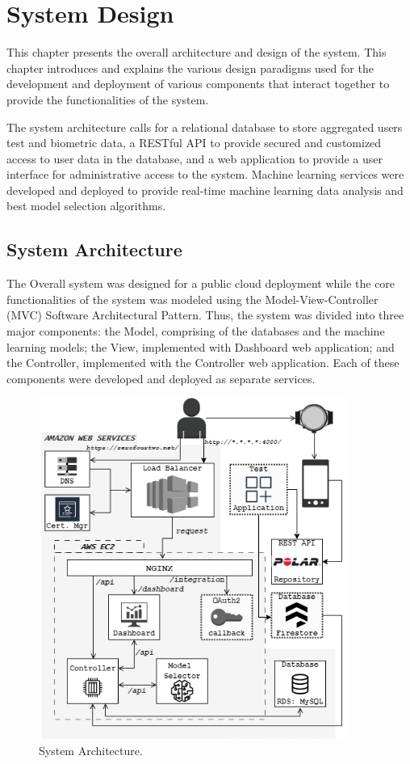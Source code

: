 \chapter{System Design}

This chapter presents the overall architecture and design of the system. This chapter introduces and explains the various design 
paradigms used for the development and deployment of various components that interact together to provide the functionalities of the system. 

The system architecture calls for a relational database to store aggregated users test and biometric data, a RESTful API to provide secured 
and customized access to user data in the database, and a web application to provide a user interface for administrative access to the 
system. Machine learning services were developed and deployed to provide real-time machine learning data analysis and best model selection 
algorithms.

\section{System Architecture}

The Overall system was designed for a public cloud deployment while the core functionalities of the system was modeled using the
Model-View-Controller (MVC) Software Architectural Pattern. Thus, the system was divided into three major components: the Model, comprising 
of the databases and the machine learning models; the View, implemented with Dashboard web application; and the Controller, implemented with 
the Controller web application. Each of these components were developed and deployed as separate services. 
\begin{figure}[h!]
    \includegraphics[width=0.9\textwidth]{images/sys_architecture.png}
    \caption{System Architecture.}
    \label{image:sys_architecture}
\end{figure}


